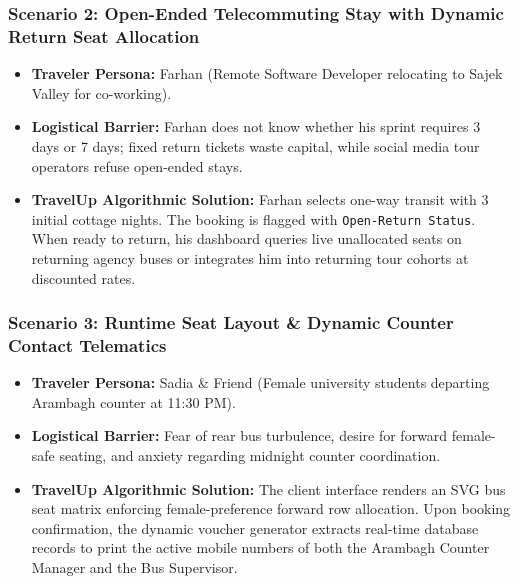 \documentclass[11pt,a4paper]{article}
\begin{document}
\subsubsection{Scenario 2: Open-Ended Telecommuting Stay with Dynamic Return Seat Allocation}
\begin{itemize}[leftmargin=*]
    \item \textbf{Traveler Persona:} Farhan (Remote Software Developer relocating to Sajek Valley for co-working).
    \item \textbf{Logistical Barrier:} Farhan does not know whether his sprint requires 3 days or 7 days; fixed return tickets waste capital, while social media tour operators refuse open-ended stays.
    \item \textbf{TravelUp Algorithmic Solution:} Farhan selects one-way transit with 3 initial cottage nights. The booking is flagged with \texttt{Open-Return Status}. When ready to return, his dashboard queries live unallocated seats on returning agency buses or integrates him into returning tour cohorts at discounted rates.
\end{itemize}

\subsubsection{Scenario 3: Runtime Seat Layout \& Dynamic Counter Contact Telematics}
\begin{itemize}[leftmargin=*]
    \item \textbf{Traveler Persona:} Sadia \& Friend (Female university students departing Arambagh counter at 11:30 PM).
    \item \textbf{Logistical Barrier:} Fear of rear bus turbulence, desire for forward female-safe seating, and anxiety regarding midnight counter coordination.
    \item \textbf{TravelUp Algorithmic Solution:} The client interface renders an SVG bus seat matrix enforcing female-preference forward row allocation. Upon booking confirmation, the dynamic voucher generator extracts real-time database records to print the active mobile numbers of both the Arambagh Counter Manager and the Bus Supervisor.
\end{itemize}
\end{document}
